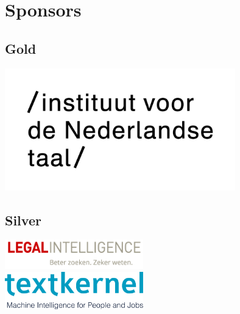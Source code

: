 \section{Sponsors}

\subsection{Gold}
\begin{center}
    \includegraphics[width=0.75\textwidth]{int-logo}
\end{center}

\subsection{Silver}
\begin{center}
    \includegraphics[width=0.45\textwidth]{LI_logo_RGB_tag} \\[2cm]
    \includegraphics[width=0.45\textwidth]{textkernel-tagline}
\end{center}

